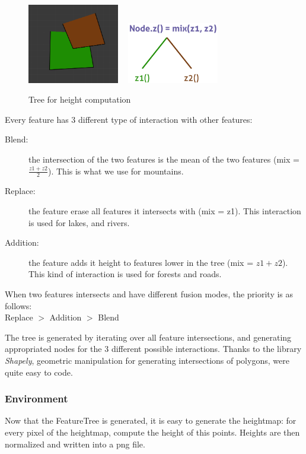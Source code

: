 \begin{figure}[h]
  \begin{center}
      \includegraphics[width=4cm]{img/feature_2.png} ~
      \includegraphics[width=4cm]{img/mix.pdf}
      \caption{Tree for height computation}
      \label{fig:tree}
   \end{center}
\end{figure}

Every feature has 3 different type of interaction with other features:
\begin{description}
  \item[Blend:] the intersection of the two features is the mean of the two features 
  (mix = $\frac{z1+z2}{2}$). This is what we use for mountains.
  \item[Replace:] the feature erase all features it intersects with (mix = z1). This interaction is used for lakes, and rivers.
  \item[Addition:] the feature adds it height to features lower in the tree (mix = $z1+z2$). This kind of interaction is used for forests and roads.
\end{description}
When two features intersects and have different fusion modes, the priority is as follows:\\
 Replace $>$ Addition $>$ Blend

The tree is generated by iterating over all feature intersections, and generating appropriated nodes for the 3 different possible interactions.
Thanks to the library \textit{Shapely}, geometric manipulation for generating intersections of polygons, were quite easy to code.

\subsubsection{Environment}
Now that the FeatureTree is generated, it is easy to generate the heightmap: for every pixel of the heightmap, compute the height of this points. Heights are then normalized and written into a png file.

